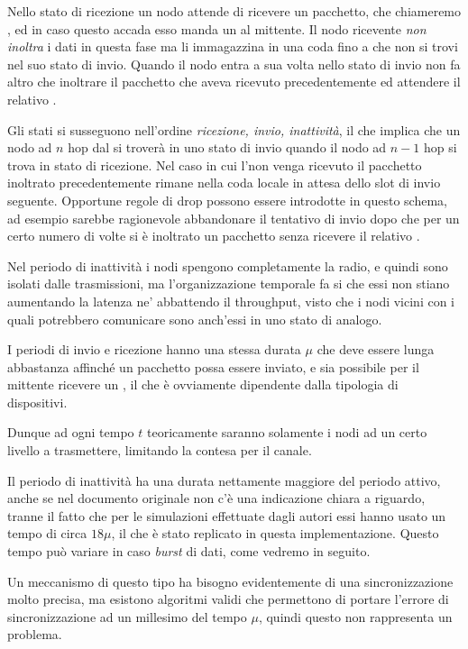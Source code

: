 \documentclass[twoside,11pt,a4paper,italian,openany]{book}
\begin{document}
Nello stato di ricezione un nodo attende di ricevere un pacchetto, che chiameremo \req,
ed in caso questo accada esso manda un \ack al mittente. 
Il nodo ricevente \emph{non inoltra} i dati in questa 
fase ma li immagazzina in una coda fino a che non si trovi nel suo stato di invio. 
Quando il nodo entra a sua volta nello stato di invio non fa altro che inoltrare il pacchetto 
che aveva ricevuto precedentemente ed attendere il relativo \ack.  

Gli stati si susseguono nell'ordine \emph{ricezione, invio, inattività}, il che implica
che un nodo ad $n$ hop dal \sink si troverà in uno stato di invio quando il nodo ad $n-1$ 
hop si trova in stato di ricezione. 
Nel caso in cui l'\ack  non venga ricevuto il pacchetto 
inoltrato precedentemente rimane nella coda locale in attesa dello slot di invio seguente. 
Opportune regole di drop possono essere introdotte in questo schema, ad esempio sarebbe 
ragionevole abbandonare il tentativo di invio dopo che per un certo numero di volte si è 
inoltrato un pacchetto senza ricevere il relativo \ack. 
 
Nel periodo di inattività i nodi spengono completamente la radio, e quindi sono isolati dalle 
trasmissioni, ma l'organizzazione temporale fa si che essi non stiano aumentando la latenza ne' 
abbattendo il throughput, visto che i nodi vicini con i quali potrebbero comunicare sono 
anch'essi in uno stato di analogo. 

I periodi di invio e ricezione hanno una stessa durata $\mu$ che deve essere lunga abbastanza 
affinché un pacchetto possa essere inviato, e  sia possibile per il mittente ricevere un  
 \ack, il che è ovviamente dipendente dalla tipologia di dispositivi. 
 
Dunque ad ogni tempo $t$ teoricamente saranno solamente i nodi ad un certo livello a 
trasmettere, limitando la contesa per il canale. 

Il periodo di inattività ha una durata nettamente maggiore del periodo attivo, anche se nel 
documento originale non c'è una indicazione chiara a riguardo, tranne il fatto che per le 
simulazioni effettuate dagli autori essi hanno usato un tempo di circa $18\mu$, il che è stato replicato in questa implementazione. 
Questo tempo può variare in caso \emph{burst} di dati, come vedremo in seguito.

Un meccanismo di questo tipo ha bisogno evidentemente di una sincronizzazione molto precisa, ma 
esistono algoritmi validi\cite{sync} che permettono di portare l'errore di sincronizzazione 
ad un millesimo del tempo $\mu$, quindi questo non rappresenta un problema. 
\end{document}
